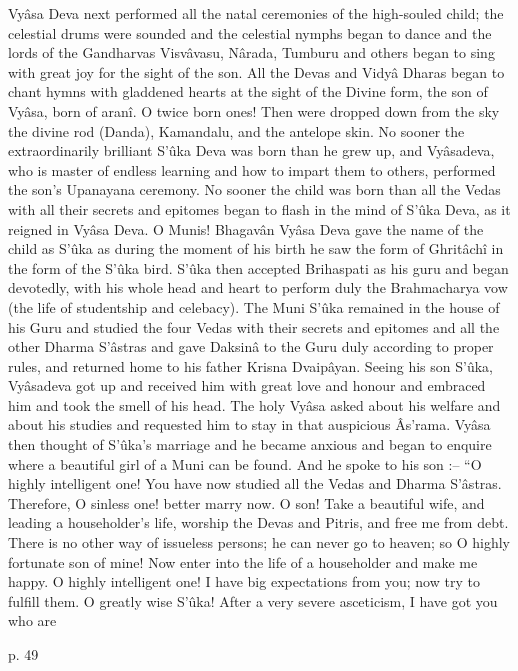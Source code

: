  

Vyâsa Deva next performed all the natal ceremonies of the high-souled child; the celestial drums were sounded and the celestial nymphs began to dance and the lords of the Gandharvas Visvâvasu, Nârada, Tumburu and others began to sing with great joy for the sight of the son. All the Devas and Vidyâ Dharas began to chant hymns with gladdened hearts at the sight of the Divine form, the son of Vyâsa, born of aranî. O twice born ones! Then were dropped down from the sky the divine rod (Danda), Kamandalu, and the antelope skin. No sooner the extraordinarily brilliant S’ûka Deva was born than he grew up, and Vyâsadeva, who is master of endless learning and how to impart them to others, performed the son's Upanayana ceremony. No sooner the child was born than all the Vedas with all their secrets and epitomes began to flash in the mind of S’ûka Deva, as it reigned in Vyâsa Deva. O Munis! Bhagavân Vyâsa Deva gave the name of the child as S’ûka as during the moment of his birth he saw the form of Ghritâchî in the form of the S’ûka bird. S’ûka then accepted Brihaspati as his guru and began devotedly, with his whole head and heart to perform duly the Brahmacharya vow (the life of studentship and celebacy). The Muni S’ûka remained in the house of his Guru and studied the four Vedas with their secrets and epitomes and all the other Dharma S'âstras and gave Daksinâ to the Guru duly according to proper rules, and returned home to his father Krisna Dvaipâyan. Seeing his son S’ûka, Vyâsadeva got up and received him with great love and honour and embraced him and took the smell of his head. The holy Vyâsa asked about his welfare and about his studies and requested him to stay in that auspicious Âs'rama. Vyâsa then thought of S’ûka's marriage and he became anxious and began to enquire where a beautiful girl of a Muni can be found. And he spoke to his son :-- “O highly intelligent one! You have now studied all the Vedas and Dharma S'âstras. Therefore, O sinless one! better marry now. O son! Take a beautiful wife, and leading a householder's life, worship the Devas and Pitris, and free me from debt. There is no other way of issueless persons; he can never go to heaven; so O highly fortunate son of mine! Now enter into the life of a householder and make me happy. O highly intelligent one! I have big expectations from you; now try to fulfill them. O greatly wise S’ûka! After a very severe asceticism, I have got you who are

 

p. 49

